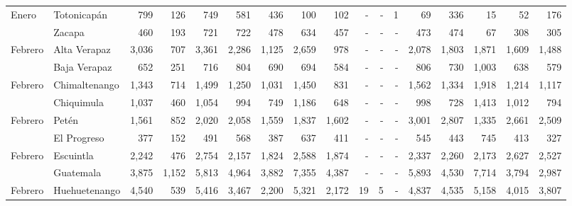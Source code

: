 \begin{landscape}
\begin{center}
\begin{longtable}{llrrrrrrrrrrrrrrr}
\multicolumn{1}{l}{	\footnotesize	 Enero 	}&	 Totonicapán 	&	 799 	&	 126 	&	 749 	&	 581 	&	 436 	&	 100 	&	 102 	&	 -   	&	 -   	&	 1 	&	 69 	&	 336 	&	 15 	&	 52 	&	 176 	\\
\rowcolor{color1!5!white}\multicolumn{1}{l}{	\footnotesize	 Enero 	}&	 Zacapa 	&	 460 	&	 193 	&	 721 	&	 722 	&	 478 	&	 634 	&	 457 	&	 -   	&	 -   	&	 -   	&	 473 	&	 474 	&	 67 	&	 308 	&	 305 	\\
\multicolumn{1}{l}{	\footnotesize	 Febrero 	}&	 Alta Verapaz 	&	 3,036 	&	 707 	&	 3,361 	&	 2,286 	&	 1,125 	&	 2,659 	&	 978 	&	 -   	&	 -   	&	 -   	&	 2,078 	&	 1,803 	&	 1,871 	&	 1,609 	&	 1,488 	\\
\rowcolor{color1!5!white}\multicolumn{1}{l}{	\footnotesize	 Febrero 	}&	 Baja Verapaz 	&	 652 	&	 251 	&	 716 	&	 804 	&	 690 	&	 694 	&	 584 	&	 -   	&	 -   	&	 -   	&	 806 	&	 730 	&	 1,003 	&	 638 	&	 579 	\\
\multicolumn{1}{l}{	\footnotesize	 Febrero 	}&	 Chimaltenango 	&	 1,343 	&	 714 	&	 1,499 	&	 1,250 	&	 1,031 	&	 1,450 	&	 831 	&	 -   	&	 -   	&	 -   	&	 1,562 	&	 1,334 	&	 1,918 	&	 1,214 	&	 1,117 	\\
\rowcolor{color1!5!white}\multicolumn{1}{l}{	\footnotesize	 Febrero 	}&	 Chiquimula 	&	 1,037 	&	 460 	&	 1,054 	&	 994 	&	 749 	&	 1,186 	&	 648 	&	 -   	&	 -   	&	 -   	&	 998 	&	 728 	&	 1,413 	&	 1,012 	&	 794 	\\
\multicolumn{1}{l}{	\footnotesize	 Febrero 	}&	 Petén 	&	 1,561 	&	 852 	&	 2,020 	&	 2,058 	&	 1,559 	&	 1,837 	&	 1,602 	&	 -   	&	 -   	&	 -   	&	 3,001 	&	 2,807 	&	 1,335 	&	 2,661 	&	 2,509 	\\
\rowcolor{color1!5!white}\multicolumn{1}{l}{	\footnotesize	 Febrero 	}&	 El Progreso 	&	 377 	&	 152 	&	 491 	&	 568 	&	 387 	&	 637 	&	 411 	&	 -   	&	 -   	&	 -   	&	 545 	&	 443 	&	 745 	&	 413 	&	 327 	\\
\multicolumn{1}{l}{	\footnotesize	 Febrero 	}&	 Escuintla 	&	 2,242 	&	 476 	&	 2,754 	&	 2,157 	&	 1,824 	&	 2,588 	&	 1,874 	&	 -   	&	 -   	&	 -   	&	 2,337 	&	 2,260 	&	 2,173 	&	 2,627 	&	 2,527 	\\
\rowcolor{color1!5!white}\multicolumn{1}{l}{	\footnotesize	 Febrero 	}&	 Guatemala 	&	 3,875 	&	 1,152 	&	 5,813 	&	 4,964 	&	 3,882 	&	 7,355 	&	 4,387 	&	 -   	&	 -   	&	 -   	&	 5,893 	&	 4,530 	&	 7,714 	&	 3,794 	&	 2,987 	\\
\multicolumn{1}{l}{	\footnotesize	 Febrero 	}&	 Huehuetenango 	&	 4,540 	&	 539 	&	 5,416 	&	 3,467 	&	 2,200 	&	 5,321 	&	 2,172 	&	 19 	&	 5 	&	 -   	&	 4,837 	&	 4,535 	&	 5,158 	&	 4,015 	&	 3,807 	\\

\end{longtable}
\end{center}
\end{landscape}
